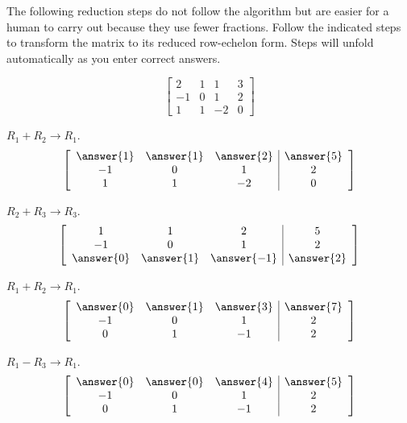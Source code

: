 \documentclass{ximera}
\begin{document}
 \begin{problem}\label{prob:twowaystorref2}
The following reduction steps do not follow the algorithm but are easier for a human to carry out because they use fewer fractions. Follow the indicated steps to transform the matrix to its reduced row-echelon form.  Steps will unfold automatically as you enter correct answers.

$$\left[\begin{array}{ccc|c}  2&1&1&3\\-1&0&1&2\\1&1&-2&0
 \end{array}\right]$$



 \begin{prompt} $R_1+R_2\rightarrow R_1$.
$$\left[\begin{array}{ccc|c}  
 \answer{1}&\answer{1}&\answer{2}&\answer{5}\\-1&0&1&2\\1&1&-2&0
 \end{array}\right]$$
\end{prompt} 

 \begin{problem}
 \begin{prompt} $R_2+R_3\rightarrow R_3$.
$$\left[\begin{array}{ccc|c}  
1&1&2&5\\-1&0&1&2\\\answer{0}&\answer{1}&\answer{-1}&\answer{2}
 \end{array}\right]$$
\end{prompt} 

 \begin{problem}
 \begin{prompt} $R_1+R_2\rightarrow R_1$.
$$\left[\begin{array}{ccc|c}  
\answer{0}&\answer{1}&\answer{3}&\answer{7}\\-1&0&1&2\\0&1&-1&2
 \end{array}\right]$$
 \end{prompt}

 \begin{problem}
 \begin{prompt} $R_1-R_3\rightarrow R_1$.
$$\left[\begin{array}{ccc|c}  
\answer{0}&\answer{0}&\answer{4}&\answer{5}\\-1&0&1&2\\0&1&-1&2
 \end{array}\right]$$
 \end{prompt}


\end{problem}
\end{problem}
\end{problem}
\end{problem}
\end{document}
